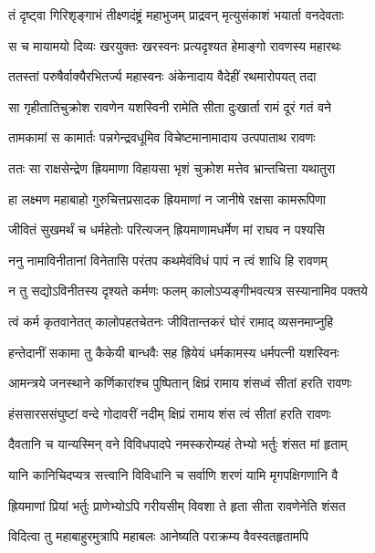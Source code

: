 \twolineshloka
{तं दृष्ट्वा गिरिशृङ्गाभं तीक्ष्णदंष्ट्रं महाभुजम्}
{प्राद्रवन् मृत्युसंकाशं भयार्ता वनदेवताः} %

\twolineshloka
{स च मायामयो दिव्यः खरयुक्तः खरस्वनः}
{प्रत्यदृश्यत हेमाङ्गो रावणस्य महारथः} %

\twolineshloka
{ततस्तां परुषैर्वाक्यैरभितर्ज्य महास्वनः}
{अंकेनादाय वैदेहीं रथमारोपयत् तदा} %

\twolineshloka
{सा गृहीतातिचुक्रोश रावणेन यशस्विनी}
{रामेति सीता दुःखार्ता रामं दूरं गतं वने} %

\twolineshloka
{तामकामां स कामार्तः पन्नगेन्द्रवधूमिव}
{विचेष्टमानामादाय उत्पपाताथ रावणः} %

\twolineshloka
{ततः सा राक्षसेन्द्रेण ह्रियमाणा विहायसा}
{भृशं चुक्रोश मत्तेव भ्रान्तचित्ता यथातुरा} %

\twolineshloka
{हा लक्ष्मण महाबाहो गुरुचित्तप्रसादक}
{ह्रियमाणां न जानीषे रक्षसा कामरूपिणा} %

\twolineshloka
{जीवितं सुखमर्थं च धर्महेतोः परित्यजन्}
{ह्रियमाणामधर्मेण मां राघव न पश्यसि} %

\twolineshloka
{ननु नामाविनीतानां विनेतासि परंतप}
{कथमेवंविधं पापं न त्वं शाधि हि रावणम्} %

\twolineshloka
{न तु सद्योऽविनीतस्य दृश्यते कर्मणः फलम्}
{कालोऽप्यङ्गीभवत्यत्र सस्यानामिव पक्तये} %

\twolineshloka
{त्वं कर्म कृतवानेतत् कालोपहतचेतनः}
{जीवितान्तकरं घोरं रामाद् व्यसनमाप्नुहि} %

\twolineshloka
{हन्तेदानीं सकामा तु कैकेयी बान्धवैः सह}
{ह्रियेयं धर्मकामस्य धर्मपत्नी यशस्विनः} %

\twolineshloka
{आमन्त्रये जनस्थाने कर्णिकारांश्च पुष्पितान्}
{क्षिप्रं रामाय शंसध्वं सीतां हरति रावणः} %

\twolineshloka
{हंससारससंघुष्टां वन्दे गोदावरीं नदीम्}
{क्षिप्रं रामाय शंस त्वं सीतां हरति रावणः} %

\twolineshloka
{दैवतानि च यान्यस्मिन् वने विविधपादपे}
{नमस्करोम्यहं तेभ्यो भर्तुः शंसत मां हृताम्} %

\twolineshloka
{यानि कानिचिदप्यत्र सत्त्वानि विविधानि च}
{सर्वाणि शरणं यामि मृगपक्षिगणानि वै} %

\twolineshloka
{ह्रियमाणां प्रियां भर्तुः प्राणेभ्योऽपि गरीयसीम्}
{विवशा ते हृता सीता रावणेनेति शंसत} %

\twolineshloka
{विदित्वा तु महाबाहुरमुत्रापि महाबलः}
{आनेष्यति पराक्रम्य वैवस्वतहृतामपि} %

